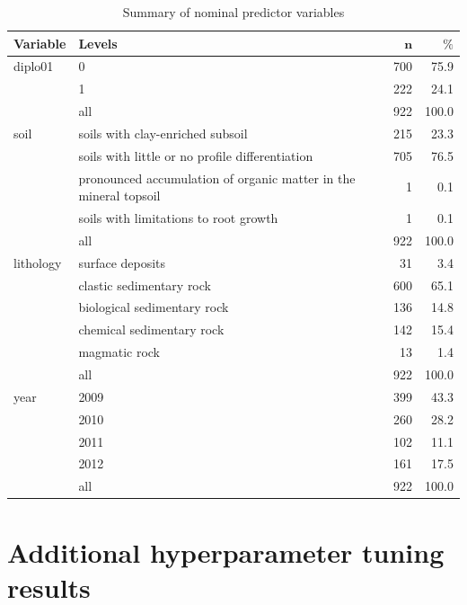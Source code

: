 \documentclass[review]{elsarticle}
\begin{document}
\begin{table}[ht]
	\centering
	\begingroup\footnotesize
	\begin{tabular}{ll|rr}
	 \textbf{Variable} & \textbf{Levels} & $\mathbf{n}$ & $\mathbf{\%}$ \\ 
		\hline
	diplo01 & 0 & 700 & 75.9 \\ 
		 & 1 & 222 & 24.1 \\ 
		 \hline
	 & all & 922 & 100.0 \\ 
		 \hline
	\hline
	soil & soils with clay-enriched subsoil & 215 & 23.3 \\ 
		 & soils with little or no profile differentiation & 705 & 76.5 \\ 
		 & pronounced accumulation of organic matter in the mineral topsoil & 1 & 0.1 \\ 
		 & soils with limitations to root growth & 1 & 0.1 \\ 
		 \hline
	 & all & 922 & 100.0 \\ 
		 \hline
	\hline
	lithology & surface deposits & 31 & 3.4 \\ 
		 & clastic sedimentary rock & 600 & 65.1 \\ 
		 & biological sedimentary rock & 136 & 14.8 \\ 
		 & chemical sedimentary rock & 142 & 15.4 \\ 
		 & magmatic rock & 13 & 1.4 \\ 
		 \hline
	 & all & 922 & 100.0 \\ 
		 \hline
	\hline
	year & 2009 & 399 & 43.3 \\ 
		 & 2010 & 260 & 28.2 \\ 
		 & 2011 & 102 & 11.1 \\ 
		 & 2012 & 161 & 17.5 \\ 
		 \hline
	 & all & 922 & 100.0 \\ 
		 \hline
	\hline
	\end{tabular}
	\endgroup
	\caption{Summary of nominal predictor variables} 
	\label{}
	\end{table}

\pagebreak

\section{Additional hyperparameter tuning results}
\end{document}
